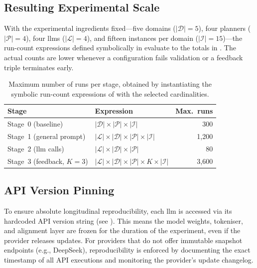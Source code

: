 \subsection{Resulting Experimental Scale}

With the experimental ingredients fixed---five domains ($|\mathcal{D}| = 5$), four planners ($|\mathcal{P}| = 4$), four \glspl{llm} ($|\mathcal{L}| = 4$), and fifteen instances per domain ($|\mathcal{I}| = 15$)---the run-count expressions defined symbolically in  evaluate to the totals in .
The actual counts are lower whenever a configuration fails validation or a feedback triple terminates early.

\begin{table}[htbp]
  \centering
  \caption{Maximum number of runs per stage, obtained by instantiating the symbolic run-count expressions of  with the selected cardinalities.}
  \label{tab:experiment_scale}
  \small
  \begin{tabular}{l l r}
    \toprule
    \textbf{Stage} & \textbf{Expression} & \textbf{Max.\ runs} \\
    \midrule
    Stage~0 (baseline)          & $|\mathcal{D}| \times |\mathcal{P}| \times |\mathcal{I}|$                               & 300 \\
    Stage~1 (general prompt)    & $|\mathcal{L}| \times |\mathcal{D}| \times |\mathcal{P}| \times |\mathcal{I}|$           & 1{,}200 \\
    Stage~2 (\gls{llm} calls)   & $|\mathcal{L}| \times |\mathcal{D}| \times |\mathcal{P}|$                               & 80 \\
    Stage~3 (feedback, $K = 3$) & $|\mathcal{L}| \times |\mathcal{D}| \times |\mathcal{P}| \times K \times |\mathcal{I}|$   & 3{,}600 \\
    \bottomrule
  \end{tabular}
\end{table}

\subsection{API Version Pinning}

To ensure absolute longitudinal reproducibility, each \gls{llm} is accessed via its hardcoded API version string (see ).
This means the model weights, tokeniser, and alignment layer are frozen for the duration of the experiment, even if the provider releases updates.
For providers that do not offer immutable snapshot endpoints (e.g., DeepSeek), reproducibility is enforced by documenting the exact timestamp of all API executions and monitoring the provider's update changelog.

